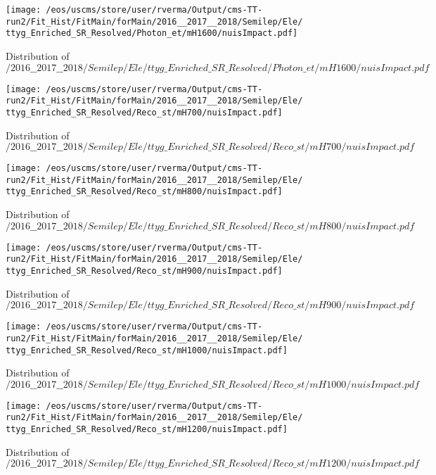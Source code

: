 \begin{figure}
\centering
\texttt{[image: /eos/uscms/store/user/rverma/Output/cms-TT-run2/Fit\_Hist/FitMain/forMain/2016\_\_2017\_\_2018/Semilep/Ele/ttyg\_Enriched\_SR\_Resolved/Photon\_et/mH1600/nuisImpact.pdf]}
\caption{Distribution of $/2016\_\_2017\_\_2018/Semilep/Ele/ttyg\_Enriched\_SR\_Resolved/Photon\_et/mH1600/nuisImpact.pdf$}
\end{figure}

\begin{figure}
\centering
\texttt{[image: /eos/uscms/store/user/rverma/Output/cms-TT-run2/Fit\_Hist/FitMain/forMain/2016\_\_2017\_\_2018/Semilep/Ele/ttyg\_Enriched\_SR\_Resolved/Reco\_st/mH700/nuisImpact.pdf]}
\caption{Distribution of $/2016\_\_2017\_\_2018/Semilep/Ele/ttyg\_Enriched\_SR\_Resolved/Reco\_st/mH700/nuisImpact.pdf$}
\end{figure}

\begin{figure}
\centering
\texttt{[image: /eos/uscms/store/user/rverma/Output/cms-TT-run2/Fit\_Hist/FitMain/forMain/2016\_\_2017\_\_2018/Semilep/Ele/ttyg\_Enriched\_SR\_Resolved/Reco\_st/mH800/nuisImpact.pdf]}
\caption{Distribution of $/2016\_\_2017\_\_2018/Semilep/Ele/ttyg\_Enriched\_SR\_Resolved/Reco\_st/mH800/nuisImpact.pdf$}
\end{figure}

\begin{figure}
\centering
\texttt{[image: /eos/uscms/store/user/rverma/Output/cms-TT-run2/Fit\_Hist/FitMain/forMain/2016\_\_2017\_\_2018/Semilep/Ele/ttyg\_Enriched\_SR\_Resolved/Reco\_st/mH900/nuisImpact.pdf]}
\caption{Distribution of $/2016\_\_2017\_\_2018/Semilep/Ele/ttyg\_Enriched\_SR\_Resolved/Reco\_st/mH900/nuisImpact.pdf$}
\end{figure}

\begin{figure}
\centering
\texttt{[image: /eos/uscms/store/user/rverma/Output/cms-TT-run2/Fit\_Hist/FitMain/forMain/2016\_\_2017\_\_2018/Semilep/Ele/ttyg\_Enriched\_SR\_Resolved/Reco\_st/mH1000/nuisImpact.pdf]}
\caption{Distribution of $/2016\_\_2017\_\_2018/Semilep/Ele/ttyg\_Enriched\_SR\_Resolved/Reco\_st/mH1000/nuisImpact.pdf$}
\end{figure}

\begin{figure}
\centering
\texttt{[image: /eos/uscms/store/user/rverma/Output/cms-TT-run2/Fit\_Hist/FitMain/forMain/2016\_\_2017\_\_2018/Semilep/Ele/ttyg\_Enriched\_SR\_Resolved/Reco\_st/mH1200/nuisImpact.pdf]}
\caption{Distribution of $/2016\_\_2017\_\_2018/Semilep/Ele/ttyg\_Enriched\_SR\_Resolved/Reco\_st/mH1200/nuisImpact.pdf$}
\end{figure}

